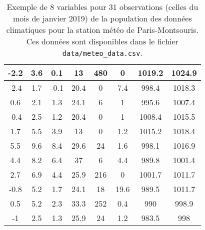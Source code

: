 \begin{table}
\begin{tabular}[h]{|c|c|c|c|c|c|c|c|}
    -2.2 & 3.6 & 0.1 & 13 & 480 & 0 & 1019.2 & 1024.9 \\ \hline
    -2.4 & 1.7 & -0.1 & 20.4 & 0 & 7.4 & 998.4 & 1018.3 \\ \hline
    0.6 & 2.1 & 1.3 & 24.1 & 6 & 1 & 995.6 & 1007.4 \\ \hline
    -0.4 & 2.5 & 1.2 & 20.4 & 0 & 1 & 1008.4 & 1015.5 \\ \hline
    1.7 & 5.5 & 3.9 & 13 & 0 & 1.2 & 1015.2 & 1018.4 \\ \hline
    5.5 & 9.6 & 8.4 & 29.6 & 24 & 1.6 & 998.1 & 1016.9 \\ \hline
    4.4 & 8.2 & 6.4 & 37 & 6 & 4.4 & 989.8 & 1001.4 \\ \hline
    2.7 & 6.9 & 4.4 & 25.9 & 216 & 0 & 1001.7 & 1011.7 \\ \hline
    -0.8 & 5.2 & 1.7 & 24.1 & 18 & 19.6 & 989.5 & 1011.7 \\ \hline
    0.5 & 5.2 & 2.3 & 33.3 & 252 & 0.4 & 990 & 998.9 \\ \hline 
    -1 & 2.5 & 1.3 & 25.9 & 24 & 1.2 & 983.5 & 998 \\ \hline
  \end{tabular}
  \caption{Exemple de 8 variables pour 31 observations (celles du mois de janvier 2019) 
    de la population des données climatiques pour la station météo de Paris-Montsouris. Ces données sont disponibles dans le fichier \texttt{data/meteo\_data.csv}.}
  \label{tab:meteo_data}
\end{table}

